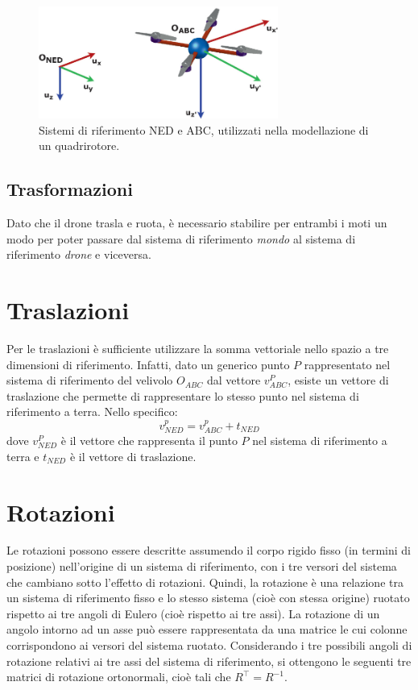 \begin{figure}[H]
    \centering
    \includegraphics[width=0.7\textwidth]{gfx/abc_frame}
    \caption[Sistemi di riferimento \acs{NED} e \acs{ABC}.]{Sistemi di riferimento \acs{NED} e \acs{ABC}, utilizzati nella modellazione di un quadrirotore.}
    \label{fig:abc_frame}
\end{figure}

\subsection{Trasformazioni}

Dato che il drone trasla e ruota, è necessario stabilire per entrambi i moti un modo per poter passare dal sistema di riferimento \emph{mondo} al sistema di riferimento \emph{drone} e viceversa. 

\section*{Traslazioni}
Per le traslazioni è sufficiente utilizzare la somma vettoriale nello spazio a tre dimensioni di riferimento. Infatti, dato un generico punto $P$ rappresentato nel sistema di riferimento del velivolo $O_{ABC}$ dal vettore $v^P_{ABC}$, esiste un vettore di traslazione che permette di rappresentare lo stesso punto nel sistema di riferimento a terra. Nello specifico:
\[ v^p_{NED} = v^p_{ABC} + t_{NED} \]
dove $v^P_{NED}$ è il vettore che rappresenta il punto $P$ nel sistema di riferimento a terra e $t_{NED}$ è il vettore di traslazione. 

\section*{Rotazioni}
Le rotazioni possono essere descritte assumendo il corpo rigido fisso (in termini di posizione) nell'origine di un sistema di riferimento, con i tre versori del sistema che cambiano sotto l'effetto di rotazioni. Quindi, la rotazione è una relazione tra un sistema di riferimento fisso e lo stesso sistema (cioè con stessa origine) ruotato rispetto ai tre angoli di Eulero (cioè rispetto ai tre assi). La rotazione di un angolo intorno ad un asse può essere rappresentata da una matrice le cui colonne corrispondono ai versori del sistema ruotato. Considerando i tre possibili angoli di rotazione relativi ai tre assi del sistema di riferimento, si ottengono le seguenti tre matrici di rotazione ortonormali, cioè tali che $R^\top = R^{-1}$.


